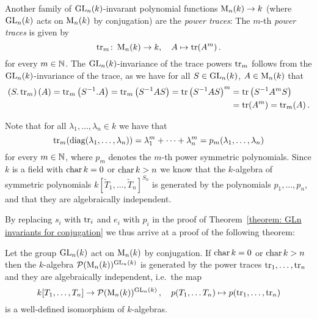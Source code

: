 \begin{fluff}
  Another family of $\operatorname{GL}_n(k)$-invarant polynomial functions $\operatorname{M}_n(k) \to k$ (where $\operatorname{GL}_n(k)$ acts on $\operatorname{M}_n(k)$ by conjugation) are the \emph{power traces}:
  The $m$-th \emph{power traces} is given by
  \[
            \operatorname{tr}_m
    \colon  \operatorname{M}_n(k)
    \to     k,
    \quad    A
    \mapsto \operatorname{tr}(A^m)  \,.
  \]
  for every $m \in \mathbb{N}$.
  The $\operatorname{GL}_n(k)$-invariance of the trace powers $\operatorname{tr}_m$ follows from the $\operatorname{GL}_n(k)$-invariance of the trace, as we have for all $S \in \operatorname{GL}_n(k)$, $A \in \operatorname{M}_n(k)$ that
    \begin{align*}
        \left( S.\operatorname{tr}_m \right)(A)
     =  \operatorname{tr}_m\left( S^{-1}.A \right)
     =  \operatorname{tr}_m\left( S^{-1} A S \right)
     =  \operatorname{tr} \left( S^{-1} A S \right)^m
    &=  \operatorname{tr} \left( S^{-1} A^m S \right) \\
    &=  \operatorname{tr}(A^m)
     =  \operatorname{tr}_m(A) \,.
  \end{align*}
  
  Note that for all $\lambda_1, \dotsc, \lambda_n \in k$ we have that
  \[
      \operatorname{tr}_m(\operatorname{diag}(\lambda_1, \dotsc, \lambda_n))
    = \lambda_1^m + \dotsb + \lambda_n^m
    = p_m(\lambda_1, \dotsc, \lambda_n)
  \]
  for every $m \in \mathbb{N}$, where $p_m$ denotes the $m$-th power symmetric polynomials.
  Since $k$ is a field with $\operatorname{char} k = 0$ or $\operatorname{char} k > n$ we know that the $k$-algebra of symmetric polynomials $k[\tilde{T}_1, \dotsc, \tilde{T}_n]^{S_n}$ is generated by the polynomials $p_1, \dotsc, p_n$, and that they are algebraically independent.
  
  By replacing $s_i$ with $\operatorname{tr}_i$ and $e_i$ with $p_i$ in the proof of Theorem~\ref{theorem: GLn invariants for conjugation} we thus arrive at a proof of the following theorem:
\end{fluff}


\begin{theorem}
  Let the group $\operatorname{GL}_n(k)$ act on $\operatorname{M}_n(k)$ by conjugation.
  If $\operatorname{char} k = 0$ or $\operatorname{char} k > n$ then the $k$-algebra $\mathcal{P}(\operatorname{M}_n(k))^{\operatorname{GL}_n(k)}$ is generated by the power traces $\operatorname{tr}_1, \dotsc, \operatorname{tr}_n$ and they are algebraically independent, i.e.\ the map
   \[
            k[T_1, \dotsc, T_n]
    \to     \mathcal{P}(\operatorname{M}_n(k))^{\operatorname{GL}_n(k)} \,,
    \quad   p(T_1, \dotsc T_n)
    \mapsto p(\operatorname{tr}_1, \dotsc, \operatorname{tr}_n)
  \]
  is a well-defined isomorphism of $k$-algebras.
\end{theorem}





